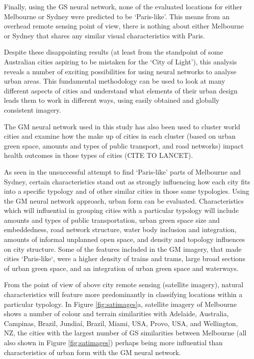 \documentclass[sageh,times]{sagej}
\begin{document}
Finally, using the GS neural network, none of the evaluated locations for either Melbourne or Sydney were predicted to be `Paris-like'. This means from an overhead remote sensing point of view, there is nothing about either Melbourne or Sydney that shares any similar visual characteristics with Paris.

Despite these disappointing results (at least from the standpoint of some Australian cities aspiring to be mistaken for the `City of Light'), this analysis reveals a number of exciting possibilities for using neural networks to analyse urban areas. This fundamental methodology can be used to look at many different aspects of cities and understand what elements of their urban design leads them to work in different ways, using easily obtained and globally consistent imagery. 

The GM neural network used in this study has also been used to cluster world cities and examine how the make up of cities in each cluster (based on urban green space, amounts and types of public transport, and road networks) impact health outcomes in those types of cities (CITE TO LANCET). 

As seen in the unsuccessful attempt to find `Paris-like' parts of Melbourne and Sydney, certain characteristics stand out as strongly influencing how each city fits into a specific typology and of other similar cities in those same typologies. Using the GM neural network approach, urban form can be evaluated. Characteristics which will influential in grouping cities with a particular typology will include amounts and types of public transportation, urban green space size and embeddedness, road network structure, water body inclusion and integration, amounts of informal unplanned open space, and density and topology influences on city structure. Some of the features included in the GM imagery, that made cities `Paris-like`, were a higher density of trains and trams, large broad sections of urban green space, and an integration of urban green space and waterways.


From the point of view of above city remote sensing (satellite imagery), natural characteristics will feature more predominantly in classifying locations within a particular typology. In Figure \ref{fig:satimages}a, satellite imagery of Melbourne shows a number of colour and terrain similarities with Adelaide, Australia, Campinas, Brazil, Jundia\'{i}, Brazil, Miami, USA, Provo, USA, and Wellington, NZ, the cities with the largest number of GS similarities between Melbourne (all also shown in Figure \ref{fig:satimages}) perhaps being more influential than characteristics of urban form with the GM neural network.
\end{document}
